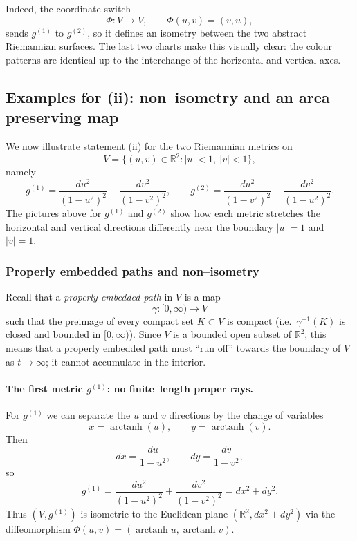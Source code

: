 \documentclass[12pt,a4paper]{article}
\theoremstyle{plain}
\theoremstyle{definition}      %
\begin{document}
	Indeed, the coordinate switch
	\[
	\Phi:V\to V,\qquad \Phi(u,v)=(v,u),
	\]
	sends $g^{(1)}$ to $g^{(2)}$, so it defines an isometry between the two
	abstract Riemannian surfaces.  The last two charts make this visually clear:
	the colour patterns are identical up to the interchange of the horizontal and
	vertical axes.
	
	\clearpage
	
	
	\subsection*{Examples for (ii): non--isometry and an area--preserving map}
	
	We now illustrate statement (ii) for the two Riemannian metrics on
	\[
	V = \{(u,v)\in\mathbb{R}^2 : |u|<1,\ |v|<1\},
	\]
	namely
	\[
	g^{(1)} = \frac{du^2}{(1-u^2)^2} + \frac{dv^2}{(1-v^2)^2},
	\qquad
	g^{(2)} = \frac{du^2}{(1-v^2)^2} + \frac{dv^2}{(1-u^2)^2}.
	\]
	The pictures above for $g^{(1)}$ and $g^{(2)}$ show how each metric stretches
	the horizontal and vertical directions differently near the boundary
	$|u|=1$ and $|v|=1$.
	
	\subsubsection*{Properly embedded paths and non--isometry}
	
	Recall that a \emph{properly embedded path} in $V$ is a map
	\[
	\gamma : [0,\infty) \to V
	\]
	such that the preimage of every compact set $K\subset V$ is compact
	(i.e.\ $\gamma^{-1}(K)$ is closed and bounded in $[0,\infty)$).  Since $V$
	is a bounded open subset of $\mathbb{R}^2$, this means that a properly
	embedded path must ``run off'' towards the boundary of $V$ as
	$t\to\infty$; it cannot accumulate in the interior.
	
	\paragraph{The first metric $g^{(1)}$: no finite--length proper rays.}
	For $g^{(1)}$ we can separate the $u$ and $v$ directions by the change of
	variables
	\[
	x = \operatorname{arctanh}(u), \qquad
	y = \operatorname{arctanh}(v).
	\]
	Then
	\[
	dx = \frac{du}{1-u^2},\qquad
	dy = \frac{dv}{1-v^2},
	\]
	so
	\[
	g^{(1)} = \frac{du^2}{(1-u^2)^2} + \frac{dv^2}{(1-v^2)^2}
	= dx^2 + dy^2.
	\]
	Thus $(V,g^{(1)})$ is isometric to the Euclidean plane
	$(\mathbb{R}^2,dx^2+dy^2)$ via the diffeomorphism
	$\Phi(u,v) = (\operatorname{arctanh}u,\operatorname{arctanh}v)$.
	
\end{document}
